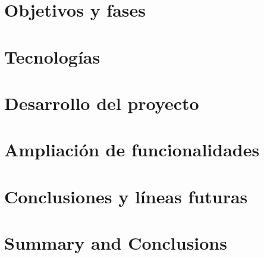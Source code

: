 \documentclass[spanish,a4paper,14pt,oneside]{extreport}
\begin{document}
\chapter{Objetivos y fases}
\label{chapter:tres}




\chapter{Tecnologías}
\label{chapter:cuatro}



\newpage{\pagestyle{empty}}
\thispagestyle{empty}

\chapter{Desarrollo del proyecto}
\label{chapter:cinco}



\newpage{\pagestyle{empty}}
\thispagestyle{empty}

\chapter{Ampliación de funcionalidades}
\label{chapter:seis}



\newpage{\pagestyle{empty}}
\thispagestyle{empty}

\chapter{Conclusiones y líneas futuras }
\label{chapter:Conclusiones}



\newpage{\pagestyle{empty}}
\thispagestyle{empty}

\chapter{Summary and Conclusions }
\label{chapter:ingles}
\end{document}
